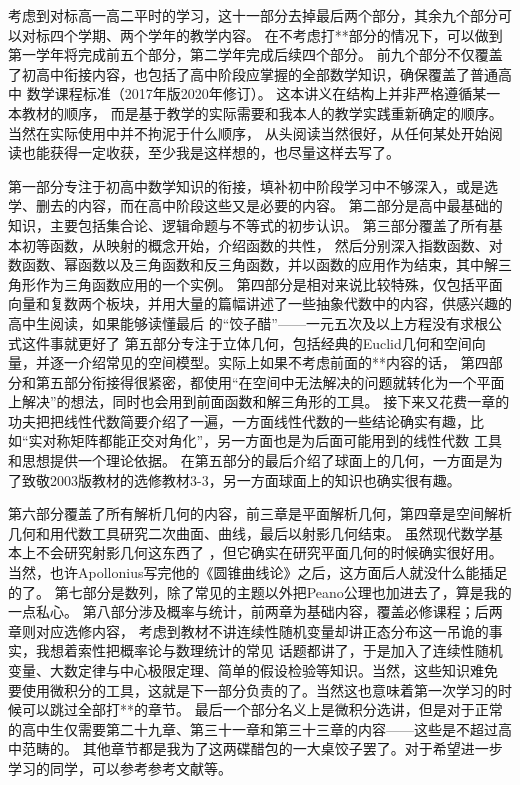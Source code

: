 \documentclass[fontset=none]{ctexbook} %
\theoremstyle{plain}
\numberwithin{equation}{subsection}%
\numberwithin{figure}{subsection}
\begin{document}
考虑到对标高一高二平时的学习，这十一部分去掉最后两个部分，其余九个部分可以对标四个学期、两个学年的教学内容。
在不考虑打**部分的情况下，可以做到第一学年将完成前五个部分，第二学年完成后续四个部分。
前九个部分不仅覆盖了初高中衔接内容，也包括了高中阶段应掌握的全部数学知识，确保覆盖了普通高中
数学课程标准（2017年版2020年修订）。
这本讲义在结构上并非严格遵循某一本教材的顺序，
而是基于教学的实际需要和我本人的教学实践重新确定的顺序。当然在实际使用中并不拘泥于什么顺序，
从头阅读当然很好，从任何某处开始阅读也能获得一定收获，至少我是这样想的，也尽量这样去写了。

第一部分专注于初高中数学知识的衔接，填补初中阶段学习中不够深入，或是选学、删去的内容，而在高中阶段这些又是必要的内容。
第二部分是高中最基础的知识，主要包括集合论、逻辑命题与不等式的初步认识。
第三部分覆盖了所有基本初等函数，从映射的概念开始，介绍函数的共性，
然后分别深入指数函数、对数函数、幂函数以及三角函数和反三角函数，并以函数的应用作为结束，其中解三角形作为三角函数应用的一个实例。
第四部分是相对来说比较特殊，仅包括平面向量和复数两个板块，并用大量的篇幅讲述了一些抽象代数中的内容，供感兴趣的高中生阅读，如果能够读懂最后
的“饺子醋”——一元五次及以上方程没有求根公式这件事就更好了
第五部分专注于立体几何，包括经典的Euclid几何和空间向量，并逐一介绍常见的空间模型。实际上如果不考虑前面的**内容的话，
第四部分和第五部分衔接得很紧密，都使用“在空间中无法解决的问题就转化为一个平面上解决”的想法，同时也会用到前面函数和解三角形的工具。
接下来又花费一章的功夫把把线性代数简要介绍了一遍，一方面线性代数的一些结论确实有趣，比如“实对称矩阵都能正交对角化”，另一方面也是为后面可能用到的线性代数
工具和思想提供一个理论依据。
在第五部分的最后介绍了球面上的几何，一方面是为了致敬2003版教材的选修教材3-3，另一方面球面上的知识也确实很有趣。

第六部分覆盖了所有解析几何的内容，前三章是平面解析几何，第四章是空间解析几何和用代数工具研究二次曲面、曲线，最后以射影几何结束。
虽然现代数学基本上不会研究射影几何这东西了
，但它确实在研究平面几何的时候确实很好用。当然，也许Apollonius写完他的《圆锥曲线论》之后，这方面后人就没什么能插足的了。
第七部分是数列，除了常见的主题以外把Peano公理也加进去了，算是我的一点私心。
第八部分涉及概率与统计，前两章为基础内容，覆盖必修课程；后两章则对应选修内容，
考虑到教材不讲连续性随机变量却讲正态分布这一吊诡的事实，我想着索性把概率论与数理统计的常见
话题都讲了，于是加入了连续性随机变量、大数定律与中心极限定理、简单的假设检验等知识。当然，这些知识难免
要使用微积分的工具，这就是下一部分负责的了。当然这也意味着第一次学习的时候可以跳过全部打**的章节。
最后一个部分名义上是微积分选讲，但是对于正常的高中生仅需要第二十九章、第三十一章和第三十三章的内容——这些是不超过高中范畴的。
其他章节都是我为了这两碟醋包的一大桌饺子罢了。对于希望进一步学习的同学，可以参考参考文献\cite{徐森林1}\cite{徐森林2}\cite{徐森林3}\cite{Zorich1}\cite{Zorich2}等。
\end{document}
